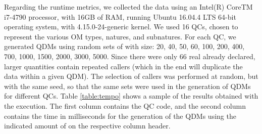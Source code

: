 
Regarding the runtime metrics, we collected the data using an Intel(R) Core{TM} i7-4790 processor, 
with 16GB of RAM, running Ubuntu 16.04.4 LTS 64-bit operating system, with 4.15.0-24-generic kernel. We used 16 QCs, 
chosen to represent the various OM types, natures, and subnatures. For each QC, we generated QDMs using 
random sets of \callers with size: 20, 40, 50, 60, 100, 200, 400, 700, 1000, 1500, 2000, 3000, 5000. 
Since there were only 66 real \callers already declared, larger quantities contain repeated callers (which in the end will duplicate 
the data within a given QDM). The selection of callers was performed at random, but with the same seed, so that the same sets were used in the 
generation of QDMs for different QCs. Table \ref{table:tempo} shows a sample of the results obtained with the execution. 
The first column contains the QC code, and the second column contains the time in milliseconds for the generation of 
the QDMs using the indicated amount of \callers on the respective column header.

